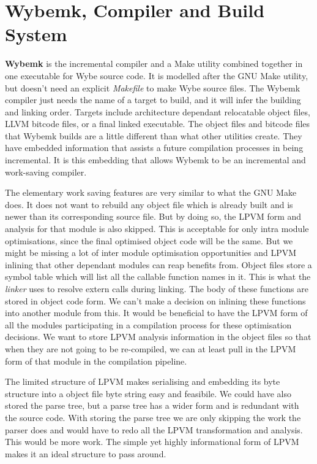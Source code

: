 \chapter{Wybemk, Compiler and Build System}
\label{chap:build_system}

\textbf{Wybemk} is the incremental compiler and a Make utility combined
together in one executable for Wybe source code. It is modelled after the GNU
Make utility, but doesn't need an explicit \textit{Makefile} to make Wybe
source files. The Wybemk compiler just needs the name of a target to build, and
it will infer the building and linking order. Targets include architecture
dependant relocatable object files, LLVM bitcode files, or a final linked
executable. The object files and bitcode files that Wybemk builds are a little
different than what other utilities create. They have embedded information that
assists a future compilation processes in being incremental. It is this
embedding that allows Wybemk to be an incremental and work-saving compiler.

The elementary work saving features are very similar to what the GNU Make does.
It does not want to rebuild any object file which is already built and is newer
than its corresponding source file. But by doing so, the LPVM form and analysis
for that module is also skipped. This is acceptable for only intra module
optimisations, since the final optimised object code will be the same. But we
might be missing a lot of inter module optimisation opportunities and LPVM
inlining that other dependant modules can reap benefits from. Object files
store a symbol table which will list all the callable function names in
it. This is what the \textit{linker} uses to resolve extern calls during
linking. The body of these functions are stored in object code form. We can't
make a decision on inlining these functions into another module from this. It
would be beneficial to have the LPVM form of all the modules participating in a
compilation process for these optimisation decisions. We want to store LPVM
analysis information in the object files so that when they are not going to be
re-compiled, we can at least pull in the LPVM form of that module in the
compilation pipeline.

The limited structure of LPVM makes serialising and embedding its byte
structure into a object file byte string easy and feasibile. We could have also
stored the parse tree, but a parse tree has a wider form and is redundant with
the source code. With storing the parse tree we are only skipping the work the
parser does and would have to redo all the LPVM transformation and
analysis. This would be more work. The simple yet highly informational form of
LPVM makes it an ideal structure to pass around.


